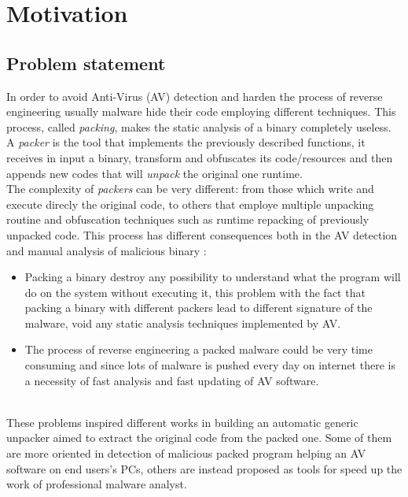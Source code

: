 \chapter{Motivation}
\label{chapter2}
\thispagestyle{empty}

\section{Problem statement}

In order to avoid Anti-Virus (AV) detection and harden the process of reverse engineering usually malware hide their code employing different techniques. This process, called \textit{packing}, makes the static analysis of a binary completely useless.
A \textit{packer} is the tool that implements the previously described functions, it receives in input a binary, transform and obfuscates its code/resources and then appends new codes that will \textit{unpack} the original one runtime.\\
The complexity of \textit{packers} can be very different: from those which write and execute direcly the original code, to others that employe multiple unpacking routine and obfuscation techniques such as runtime repacking of previously unpacked code.
This process has different consequences both in the AV detection and manual analysis of malicious binary :
\begin{itemize}
\item Packing a binary destroy any possibility to understand what the program will do on the system without executing it, this problem with the fact that packing a binary with different packers lead to different signature of the malware, void any static analysis techniques implemented by AV. 

\item The process of reverse engineering a packed malware could be very time consuming and since lots of malware is pushed every day on internet there is a necessity of fast analysis and fast updating of AV software.
\end{itemize}
\\
These problems inspired different works in building an automatic generic unpacker aimed to extract the original code from the packed one. Some of them are more oriented in detection of malicious packed program helping an AV software on end users's PCs, others are instead proposed as tools for speed up the work of professional malware analyst.

